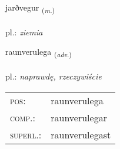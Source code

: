 \documentclass[frontgrid, backgrid]{flacards}\usepackage[]{graphicx}\usepackage[]{xcolor}
\begin{document}
\renewcommand{\blhead}{\vskip5pt {\small\bfseries\footnotesize Nafnorð | rzeczownik }}
\renewcommand{\bcfoot}{\vskip5pt \hspace{2pt}{\small\bfseries\footnotesize 3K}}


{jarðvegur \small{\textsubscript{(\textit{m.})}} \\[1ex] %
\textphonetic{[jarðvɛɣʏr]} \\
pl.: \emph{ziemia} \\  [2ex]
\renewcommand*{\arraystretch}{0.8}
}

\renewcommand{\flhead}{\vskip5pt \fboxsep=0pt {\small\bfseries\footnotesize Atviksorð | przysłówek}}
\renewcommand{\fcfoot}{\vskip5pt \fboxsep=0pt \hspace{2pt}{\small\bfseries\footnotesize 3K}}

\renewcommand{\blhead}{\vskip5pt {\small\bfseries\footnotesize Atviksorð | przysłówek }}
\renewcommand{\bcfoot}{\vskip5pt \hspace{2pt}{\small\bfseries\footnotesize 3K}}


{raunverulega \small{\textsubscript{(\textit{adv.})}} \\[1ex] %
\textphonetic{[rœinvɛrʏlɛɣa]} \\
pl.: \emph{naprawdę, rzeczywiście} \\  [2ex]
\renewcommand*{\arraystretch}{0.8}
\begin{tabular}{ll}
\textsc{pos}: & raunverulega \\ 
\textsc{comp.}: & raunverulegar \\ 
\textsc{superl.}: & raunverulegast \\
\end{tabular}
}
\end{document}
